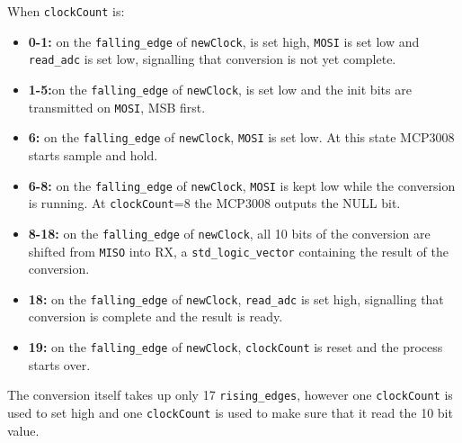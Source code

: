 When \texttt{clockCount} is:
\begin{itemize}
	\item \textbf{0-1:} on the \texttt{falling\_edge} of \texttt{newClock}, \cs is set high, \texttt{MOSI} is set low and \texttt{read\_adc} is set low, signalling that conversion is not yet complete.\\
	\item \textbf{1-5:}on the \texttt{falling\_edge} of \texttt{newClock}, \cs is set low and the init bits are transmitted on \texttt{MOSI}, MSB first.
	\item \textbf{6:} on the \texttt{falling\_edge} of \texttt{newClock}, \texttt{MOSI} is set low. At this state MCP3008 starts sample and hold.
	\item \textbf{6-8:} on the \texttt{falling\_edge} of \texttt{newClock}, \texttt{MOSI} is kept low while the conversion is running. At \texttt{clockCount}=8 the MCP3008 outputs the NULL bit.
	\item \textbf{8-18:} on the \texttt{falling\_edge} of \texttt{newClock}, all 10 bits of the conversion are shifted from \texttt{MISO} into RX, a \texttt{std\_logic\_vector} containing the result of the conversion.
	\item \textbf{18:} on the \texttt{falling\_edge} of \texttt{newClock}, \texttt{read\_adc} is set high, signalling that conversion is complete and the result is ready.
	\item \textbf{19:} on the \texttt{falling\_edge} of \texttt{newClock}, \texttt{clockCount} is reset and the process starts over.
\end{itemize}

The conversion itself takes up only 17 \texttt{rising\_edges}, however one \texttt{clockCount} is used to set \cs high  and one \texttt{clockCount} is used to make sure that it read the 10 bit value. 



